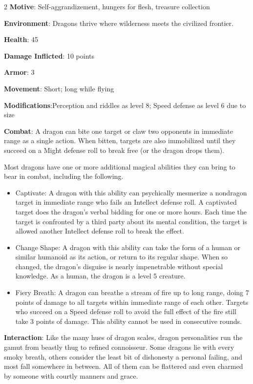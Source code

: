 \begin{multicols}{2}
\textbf{Motive}: Self-aggrandizement, hungers for flesh, treasure collection

\textbf{Environment}: Dragons thrive where wilderness meets the civilized frontier.

\textbf{Health}: 45

\textbf{Damage Inflicted}: 10 points

\textbf{Armor}: 3

\textbf{Movement}: Short; long while flying

\textbf{Modifications}:Perception and riddles as level 8; Speed defense as level 6 due to size

\textbf{Combat}: A dragon can bite one target or claw two opponents in immediate range as a single action. When bitten, targets are also immobilized until they succeed on a Might defense roll to break free (or the dragon drops them).

Most dragons have one or more additional magical abilities they can bring to bear in combat, including the following.

\begin{itemize}

\item Captivate: A dragon with this ability can psychically mesmerize a nondragon target in immediate range who fails an Intellect defense roll. A captivated target does the dragon’s verbal bidding for one or more hours. Each time the target is confronted by a third party about its mental condition, the target is allowed another Intellect defense roll to break the effect.

\item Change Shape: A dragon with this ability can take the form of a human or similar humanoid as its action, or return to its regular shape. When so changed, the dragon’s disguise is nearly impenetrable without special knowledge. As a human, the dragon is a level 5 creature.

\item Fiery Breath: A dragon can breathe a stream of fire up to long range, doing 7 points of damage to all targets within immediate range of each other. Targets who succeed on a Speed defense roll to avoid the full effect of the fire still take 3 points of damage. This ability cannot be used in consecutive rounds.
\end{itemize}

\textbf{Interaction}: Like the many hues of dragon scales, dragon personalities run the gamut from beastly thug to refined connoisseur. Some dragons lie with every smoky breath, others consider the least bit of dishonesty a personal failing, and most fall somewhere in between. All of them can be flattered and even charmed by someone with courtly manners and grace.


\end{multicols}
